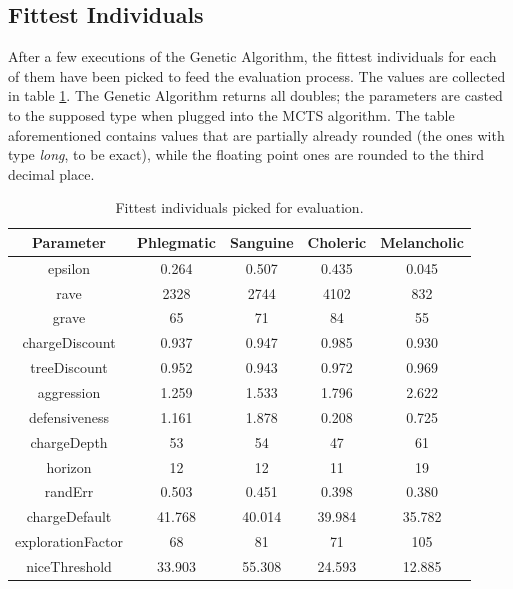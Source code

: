 \subsection{Fittest Individuals}
After a few executions of the Genetic Algorithm, the fittest individuals for each of them have been picked to feed the evaluation process. The values are collected in table \ref{tab:fittest}. The Genetic Algorithm returns all doubles; the parameters are casted to the supposed type when plugged into the MCTS algorithm. The table aforementioned contains values that are partially already rounded (the ones with type \emph{long}, to be exact), while the floating point ones are rounded to the third decimal place.
\begin{table}[h]
	\caption{Fittest individuals picked for evaluation.}
    \centering
    \scriptsize
    \begin{tabular}{|c|c|c|c|c|}
    \hline
    Parameter & Phlegmatic & Sanguine & Choleric & Melancholic \\
        \hline
    epsilon & 0.264 & 0.507 & 0.435 & 0.045\\
        \hline
    rave & 2328 & 2744 & 4102 & 832\\
        \hline
    grave & 65 & 71 & 84 & 55\\
        \hline
    chargeDiscount &  0.937 & 0.947 & 0.985 & 0.930\\ 
        \hline
    treeDiscount & 0.952 & 0.943 & 0.972 & 0.969\\
        \hline
    aggression & 1.259 & 1.533 & 1.796 & 2.622\\ 
        \hline
    defensiveness & 1.161 & 1.878 & 0.208 & 0.725\\ 
        \hline
    chargeDepth & 53 & 54 & 47 & 61\\ 
        \hline
    horizon & 12 & 12 & 11 & 19\\
        \hline
    randErr & 0.503 & 0.451 & 0.398 & 0.380\\
        \hline
    chargeDefault & 41.768 & 40.014 & 39.984 & 35.782\\
        \hline
    explorationFactor & 68 & 81 & 71 & 105\\ 
        \hline
    niceThreshold & 33.903 & 55.308 & 24.593 & 12.885\\
        \hline
    \end{tabular}
    \label{tab:fittest}
\end{table}
